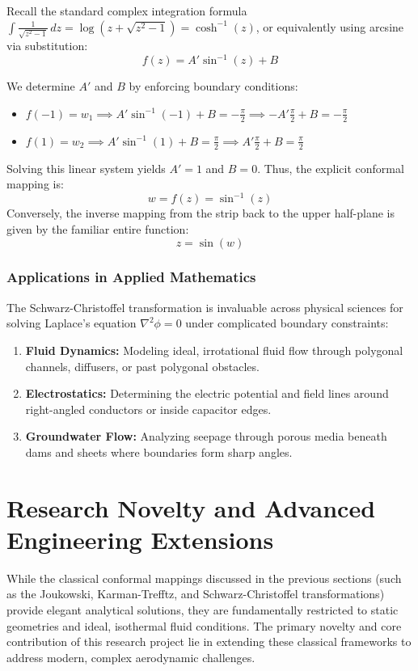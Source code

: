 \documentclass[12pt,a4paper]{article}
\begin{document}
Recall the standard complex integration formula $\int \frac{1}{\sqrt{z^2 - 1}} \, dz = \log(z + \sqrt{z^2 - 1}) = \cosh^{-1}(z)$, or equivalently using arcsine via substitution:
\begin{equation}
    f(z) = A' \sin^{-1}(z) + B
\end{equation}

We determine $A'$ and $B$ by enforcing boundary conditions:
\begin{itemize}
    \item $f(-1) = w_1 \implies A'\sin^{-1}(-1) + B = -\frac{\pi}{2} \implies -A'\frac{\pi}{2} + B = -\frac{\pi}{2}$
    \item $f(1) = w_2 \implies A'\sin^{-1}(1) + B = \frac{\pi}{2} \implies A'\frac{\pi}{2} + B = \frac{\pi}{2}$
\end{itemize}

Solving this linear system yields $A' = 1$ and $B = 0$. Thus, the explicit conformal mapping is:
\begin{equation}
    w = f(z) = \sin^{-1}(z)
\end{equation}
Conversely, the inverse mapping from the strip back to the upper half-plane is given by the familiar entire function:
\begin{equation}
    z = \sin(w)
\end{equation}

\subsubsection{Applications in Applied Mathematics}
The Schwarz-Christoffel transformation is invaluable across physical sciences for solving Laplace's equation $\nabla^2 \phi = 0$ under complicated boundary constraints:
\begin{enumerate}
    \item \textbf{Fluid Dynamics:} Modeling ideal, irrotational fluid flow through polygonal channels, diffusers, or past polygonal obstacles.
    \item \textbf{Electrostatics:} Determining the electric potential and field lines around right-angled conductors or inside capacitor edges.
    \item \textbf{Groundwater Flow:} Analyzing seepage through porous media beneath dams and sheets where boundaries form sharp angles.
\end{enumerate}
\section{Research Novelty and Advanced Engineering Extensions}
While the classical conformal mappings discussed in the previous sections (such as the Joukowski, Karman-Trefftz, and Schwarz-Christoffel transformations) provide elegant analytical solutions, they are fundamentally restricted to static geometries and ideal, isothermal fluid conditions. The primary novelty and core contribution of this research project lie in extending these classical frameworks to address modern, complex aerodynamic challenges. 
\end{document}
